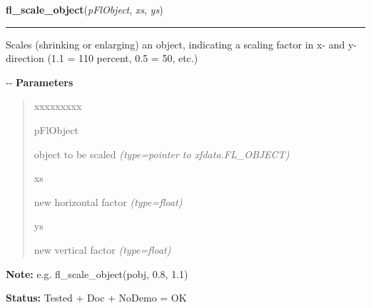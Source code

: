     \label{xformslib:flbasic:fl_scale_object}

    \vspace{0.5ex}

\hspace{.8\funcindent}\begin{boxedminipage}{\funcwidth}

    \raggedright \textbf{fl\_scale\_object}(\textit{pFlObject}, \textit{xs}, \textit{ys})

    \vspace{-1.5ex}

    \rule{\textwidth}{0.5\fboxrule}
\setlength{\parskip}{2ex}

Scales (shrinking or enlarging) an object, indicating a scaling factor
in x- and y-direction (1.1 = 110 percent, 0.5 = 50, etc.)

-{}-
\setlength{\parskip}{1ex}
      \textbf{Parameters}
      \vspace{-1ex}

      \begin{quote}
        \begin{Ventry}{xxxxxxxxx}

          \item[pFlObject]


object to be scaled
            {\it (type=pointer to xfdata.FL\_OBJECT)}

          \item[xs]


new horizontal factor
            {\it (type=float)}

          \item[ys]


new vertical factor
            {\it (type=float)}

        \end{Ventry}

      \end{quote}

\textbf{Note:} 
e.g. fl\_scale\_object(pobj, 0.8, 1.1)


\textbf{Status:} 
Tested + Doc + NoDemo = OK


    \end{boxedminipage}

    \label{xformslib:flbasic:fl_show_object}

